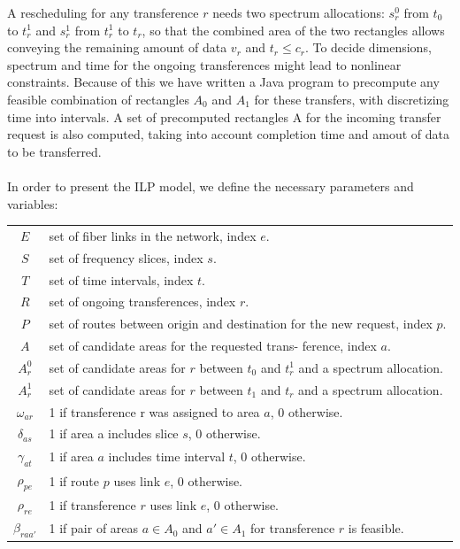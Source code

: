 \documentclass[11pt,a4paper]{article}
\begin{document}
A rescheduling for any transference $r$ needs two spectrum allocations: $s^{0}_{r}$ from $t_{0}$ to $t^{1}_{r}$ and $s^{1}_{r}$ from $t^{1}_{r}$ to $t_{r}$, so that the combined area of the two rectangles allows conveying the remaining amount of data $v_{r}$ and $t_{r} \leq  c_{r}$. To decide dimensions, spectrum and time for the ongoing transferences might lead to nonlinear constraints. Because of this we have written a Java program to precompute any feasible combination of rectangles $A_{0}$ and $A_{1}$ for these transfers, with discretizing time into intervals. A set of precomputed rectangles A for the incoming transfer request is also computed, taking into account completion time and amout of data to be transferred.\\\\
In order to present the ILP model, we define the necessary parameters and variables:
\begin{table}[H]
\small
\begin{tabular}{c l}
$E$ & set of fiber links in the network, index $e$.\\
$S$ &  set of frequency slices, index $s$.\\
$T$ & set of time intervals, index $t$.\\
$R$ & set of ongoing transferences, index $r$.\\
$P$ & set of routes between origin and destination for the new request, index $p$.\\
$A$ & set of candidate areas for the requested trans- ference, index $a$.\\
$A^{0}_{r}$ & set of candidate areas for $r$ between $t_{0}$ and $t^{1}_{r}$ and a spectrum allocation.\\
$A^{1}_{r}$ & set of candidate areas for $r$ between $t_{1}$ and $t_{r}$ and a spectrum allocation.\\
$\omega_{ar}$ & 1 if transference r was assigned to area $a$, 0 otherwise.\\
$\delta_{as}$ & 1 if area a includes slice $s$, 0 otherwise.\\
$\gamma_{at}$ & 1 if area $a$ includes time interval $t$, 0 otherwise.\\ 
$\rho_{pe}$ & 1 if route $p$ uses link $e$, 0 otherwise.\\
$\rho_{re}$ & 1 if transference $r$ uses link $e$, 0 otherwise.\\
$\beta_{raa'}$ & 1 if pair of areas $a \in A_{0}$ and $a' \in A_{1}$ for transference $r$ is feasible.\\
\end{tabular}
\end{table}
\end{document}
